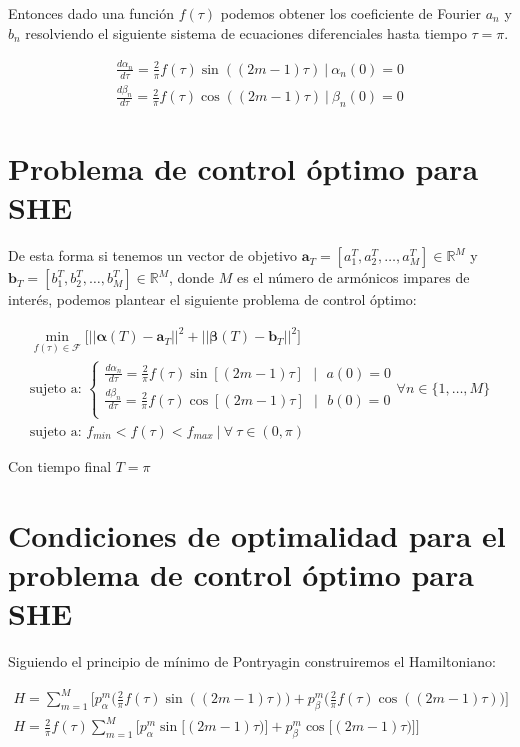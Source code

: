 Entonces dado una función $f(\tau)$ podemos obtener los coeficiente de Fourier $a_n$ y $b_n$ resolviendo el siguiente sistema de ecuaciones diferenciales hasta tiempo $\tau=\pi$.

\begin{gather}
    \frac{d \alpha_n}{d\tau} = \frac{2}{\pi}f(\tau) \sin((2m-1)\tau) \ | \ \alpha_n(0) = 0 \\
    \frac{d \beta_n}{d\tau} = \frac{2}{\pi}f(\tau) \cos((2m-1)\tau) \ | \ \beta_n(0) = 0
\end{gather}

\section{Problema de control óptimo para SHE}
De esta forma si tenemos un vector de objetivo $\bm{a}_T = [a_1^T,a_2^T,\dots,a_{M}^T] \in \mathbb{R}^M$ y  $\bm{b}_T = [b_1^T,b_2^T,\dots,b_{M}^T] \in \mathbb{R}^M$, donde $M$ es el número de armónicos impares de interés, podemos plantear el siguiente problema de control óptimo:

\begin{gather}
    \min_{f(\tau) \in \mathcal{F}} \big[  || \bm{\alpha}(T) - \bm{a}_T ||^2  + || \bm{\beta}(T) - \bm{b}_T ||^2 \big] \\
    \text{sujeto a: }
    \begin{cases}
        \frac{d \alpha_n}{d\tau} = \frac{2}{\pi}  f(\tau) \sin[(2m-1) \tau ] \ \ \ | \ \ \ a(0) = 0   \\
        \frac{d \beta_n}{d\tau}  = \frac{2}{\pi}  f(\tau) \cos[(2m-1) \tau ] \ \ \ | \ \ \ b(0) = 0   \\
    \end{cases}
    \forall n \in \{ 1, \dots,M\}  \\ 
    \text{sujeto a: } f_{min} < f(\tau) < f_{max} \ | \ \forall \ \tau \in (0,\pi)  
\end{gather}

Con tiempo final $T = \pi$


\section{Condiciones de optimalidad  para el problema de control óptimo para SHE}


Siguiendo el principio de mínimo de Pontryagin construiremos el Hamiltoniano:

\begin{gather}
    H = \sum_{m=1}^M \Bigg[ p_\alpha^m \Bigg(\frac{2}{\pi} f(\tau) \sin((2m-1)\tau)\Bigg) + p_\beta^m \Bigg(\frac{2}{\pi} f(\tau) \cos((2m-1)\tau)\Bigg) \Bigg] \\
    H = \frac{2}{\pi} f(\tau)\sum_{m=1}^M \Bigg[  p_\alpha^m   \sin \big[(2m-1)\tau)\big] 
                                                + p_\beta^m   \cos \big[ (2m-1)\tau)\big] \Bigg]
\end{gather}
 
